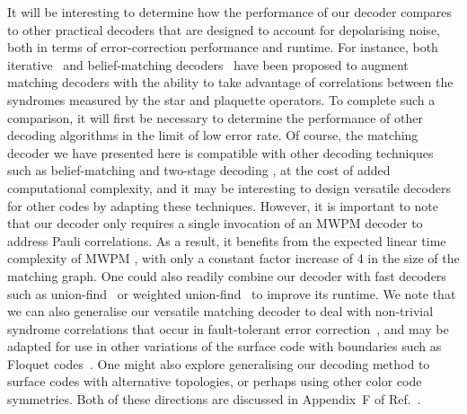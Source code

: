 \documentclass[a4paper,twocolumn,11pt,accepted=2024-12-23]{quantumarticle}
\begin{document}
It will be interesting to determine how the performance of our decoder compares to other practical decoders that are designed to account for depolarising noise, both in terms of error-correction performance and runtime. For instance, both iterative~\cite{delfosse2014decoding, fowler2013optimal} and belief-matching decoders~\cite{higgott2023improved} have been proposed to augment matching decoders with the ability to take advantage of correlations between the syndromes measured by the star and plaquette operators. To complete such a comparison, it will first be necessary to determine the performance of other decoding algorithms in the limit of low error rate. Of course, the matching decoder we have presented here is compatible with other decoding techniques such as belief-matching and two-stage decoding \cite{criger2018multi, roffe2023bias}, at the cost of added computational complexity, and it may be interesting to design versatile decoders for other codes by adapting these techniques. However, it is important to note that our decoder only requires a single invocation of an MWPM decoder to address Pauli correlations. As a result, it benefits from the expected linear time complexity of MWPM \cite{higgott2023sparse}, with only a constant factor increase of 4 in the size of the matching graph. One could also readily combine our decoder with fast decoders such as union-find~\cite{Delfosse2021almostlineartime, chan2023strictly, griffiths2023unionfind} or weighted union-find~\cite{Huang2020} to improve its runtime. We note that we can also generalise our versatile matching decoder to deal with non-trivial syndrome correlations that occur in fault-tolerant error correction~\cite{wang2003confinement, Raussendorf2005long, Fowler12surface}, and may be adapted for use in other variations of the surface code with boundaries such as Floquet codes~\cite{Haah2022boundarieshoneycomb, kesselring2022anyon}. One might also explore generalising our decoding method to surface codes with alternative topologies, or perhaps using other color code symmetries. Both of these directions are discussed in Appendix~F of Ref.~\cite{sahay2022decoder}.
\end{document}
